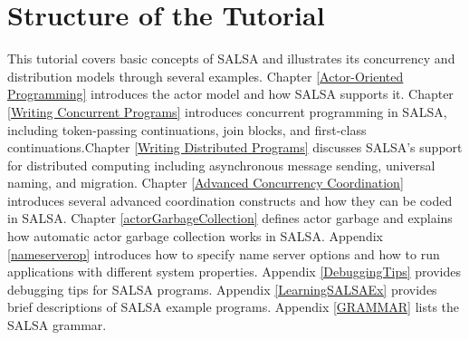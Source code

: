 \section{Structure of the Tutorial}\label{Structure of the Tutorial}
This tutorial covers basic concepts of SALSA and illustrates its concurrency 
and distribution models through several examples. Chapter \ref{Actor-Oriented Programming} introduces the 
actor model and how SALSA supports it. Chapter \ref{Writing Concurrent Programs} introduces concurrent 
programming in SALSA, including token-passing continuations, join 
blocks, and first-class continuations.Chapter \ref{Writing Distributed Programs} discusses SALSA's 
support for distributed computing including asynchronous message sending, 
universal naming, and migration. Chapter \ref{Advanced Concurrency Coordination} introduces several advanced 
coordination constructs and how they can be coded in SALSA. 
Chapter \ref{actorGarbageCollection} defines actor garbage and
explains how automatic actor garbage collection works in SALSA.
Appendix \ref{nameserverop} introduces how to specify name server options and how to run applications
with different system properties. Appendix \ref{DebuggingTips} provides debugging tips for 
SALSA programs. Appendix \ref{LearningSALSAEx} provides brief descriptions of 
SALSA example programs. Appendix \ref{GRAMMAR} lists the SALSA grammar.

